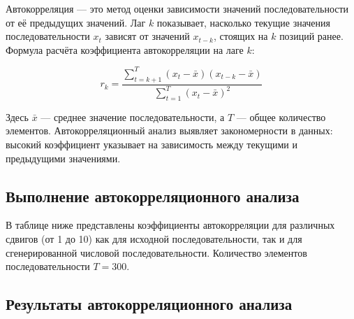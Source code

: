 Автокорреляция — это метод оценки зависимости значений последовательности от её предыдущих значений. Лаг \( k \) показывает, насколько текущие значения последовательности \( x_t \) зависят от значений \( x_{t-k} \), стоящих на \( k \) позиций ранее. Формула расчёта коэффициента автокорреляции на лаге \( k \):

\[
	r_k = \frac{\sum_{t=k+1}^{T} (x_t - \bar{x}) (x_{t-k} - \bar{x})}{\sum_{t=1}^{T} (x_t - \bar{x})^2}
\]

Здесь \( \bar{x} \) — среднее значение последовательности, а \( T \) — общее количество элементов. Автокорреляционный анализ выявляет закономерности в данных: высокий коэффициент указывает на зависимость между текущими и предыдущими значениями.
\subsection{Выполнение автокорреляционного анализа}

В таблице ниже представлены коэффициенты автокорреляции для различных сдвигов (от 1 до 10) как для исходной последовательности, так и для сгенерированной числовой последовательности. Количество элементов последовательности \( T = 300 \).

\begin{table}[H]
	\centering
	\caption{Коэф. автокорреляции для заданной и сгенерированной ЧП}
\end{table}

\subsection{Результаты автокорреляционного анализа}

